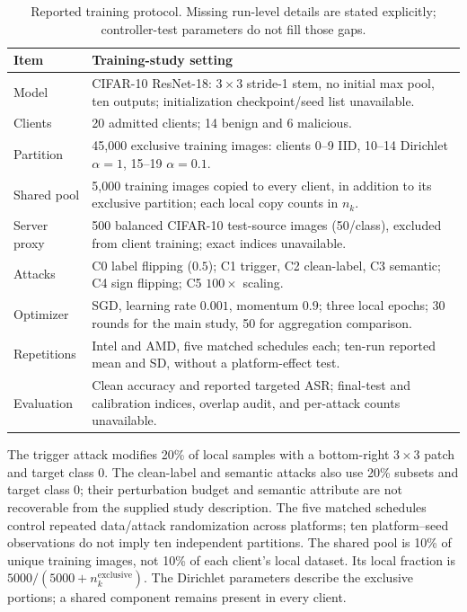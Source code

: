 \documentclass[conference,compsoc]{IEEEtran}
\begin{document}
\begin{table}[!htb]
    \centering
    \caption{Reported training protocol. Missing run-level details are stated
        explicitly; controller-test parameters do not fill those gaps.}
    \label{tab:training_setup}
    \small
    \setlength{\tabcolsep}{3pt}
    \begin{tabular}{@{}p{1.65cm}p{6.2cm}@{}}
        \toprule
        Item & Training-study setting \\
        \midrule
        Model & CIFAR-10 ResNet-18: $3\!\times\!3$ stride-1 stem, no initial
        max pool, ten outputs; initialization checkpoint/seed list unavailable. \\
        Clients & 20 admitted clients; 14 benign and 6 malicious. \\
        Partition & 45,000 exclusive training images: clients 0--9 IID,
        10--14 Dirichlet $\alpha=1$, 15--19 $\alpha=0.1$. \\
        Shared pool & 5,000 training images copied to every client, in addition
        to its exclusive partition; each local copy counts in $n_k$. \\
        Server proxy & 500 balanced CIFAR-10 test-source images (50/class),
        excluded from client training; exact indices unavailable. \\
        Attacks & C0 label flipping ($0.5$); C1 trigger, C2 clean-label,
        C3 semantic; C4 sign flipping; C5 $100\times$ scaling. \\
        Optimizer & SGD, learning rate $0.001$, momentum $0.9$; three local
        epochs; 30 rounds for the main study, 50 for aggregation comparison. \\
        Repetitions & Intel and AMD, five matched schedules each; ten-run
        reported mean and SD, without a platform-effect test. \\
        Evaluation & Clean accuracy and reported targeted ASR; final-test and
        calibration indices, overlap audit, and per-attack counts unavailable. \\
        \bottomrule
    \end{tabular}
\end{table}

The trigger attack modifies 20\% of local samples with a bottom-right
$3\times3$ patch and target class 0. The clean-label and semantic attacks also
use 20\% subsets and target class 0; their perturbation budget and semantic
attribute are not recoverable from the supplied study description. The five
matched schedules control repeated data/attack randomization across platforms;
ten platform--seed observations do not imply ten independent partitions.
The shared pool is 10\% of unique training images, not 10\% of each client's
local dataset. Its local fraction is $5000/(5000+n_k^{\mathrm{exclusive}})$.
The Dirichlet parameters describe the exclusive portions; a shared component
remains present in every client.
\end{document}
